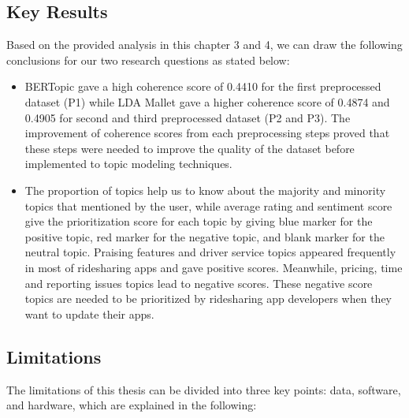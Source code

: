 \documentclass[12pt]{article}
\begin{document}
\subsection{Key Results}
Based on the provided analysis in this chapter 3 and 4, we can draw the following conclusions for our two research questions as stated below:

\begin{itemize}
    \item BERTopic gave a high coherence score of 0.4410 for the first preprocessed dataset (P1) while LDA Mallet gave a higher coherence score of 0.4874 and 0.4905 for second and third preprocessed dataset (P2 and P3). The improvement of coherence scores from each preprocessing steps proved that these steps were needed to improve the quality of the dataset before implemented to topic modeling techniques.
    \item The proportion of topics help us to know about the majority and minority topics that mentioned by the user, while average rating and sentiment score give the prioritization score for each topic by giving blue marker for the positive topic, red marker for the negative topic, and blank marker for the neutral topic. Praising features and driver service topics appeared frequently in most of ridesharing apps and gave positive scores. Meanwhile, pricing, time and reporting issues topics lead to negative scores. These negative score topics are needed to be prioritized by ridesharing app developers when they want to update their apps.
\end{itemize}

\subsection{Limitations}
The limitations of this thesis can be divided into three key points: data, software, and hardware, which are explained in the following:
\end{document}

